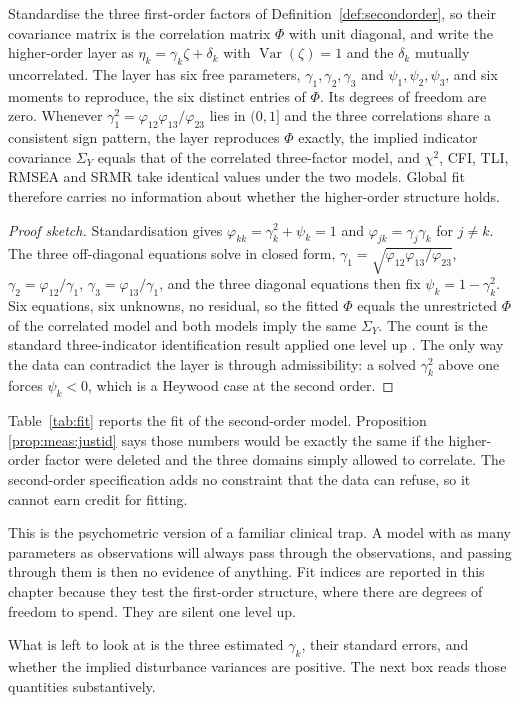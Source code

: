 \begin{proposition}
\label{prop:meas:justid}
Standardise the three first-order factors of Definition~\ref{def:secondorder},
so their covariance matrix is the correlation matrix $\Phi$ with unit diagonal,
and write the higher-order layer as $\eta_k=\gamma_k\zeta+\delta_k$ with
$\operatorname{Var}(\zeta)=1$ and the $\delta_k$ mutually uncorrelated. The
layer has six free parameters, $\gamma_1,\gamma_2,\gamma_3$ and
$\psi_1,\psi_2,\psi_3$, and six moments to reproduce, the six distinct entries
of $\Phi$. Its degrees of freedom are zero. Whenever
$\gamma_1^{2}=\varphi_{12}\varphi_{13}/\varphi_{23}$ lies in $(0,1]$ and the
three correlations share a consistent sign pattern, the layer reproduces $\Phi$
exactly, the implied indicator covariance $\Sigma_Y$ equals that of the
correlated three-factor model, and $\chi^{2}$, CFI, TLI, RMSEA and SRMR take
identical values under the two models. Global fit therefore carries no
information about whether the higher-order structure holds.
\end{proposition}

\begin{proof}[Proof sketch]
Standardisation gives $\varphi_{kk}=\gamma_k^{2}+\psi_k=1$ and
$\varphi_{jk}=\gamma_j\gamma_k$ for $j\neq k$. The three off-diagonal
equations solve in closed form,
$\gamma_1=\sqrt{\varphi_{12}\varphi_{13}/\varphi_{23}}$,
$\gamma_2=\varphi_{12}/\gamma_1$, $\gamma_3=\varphi_{13}/\gamma_1$, and the
three diagonal equations then fix $\psi_k=1-\gamma_k^{2}$. Six equations, six
unknowns, no residual, so the fitted $\Phi$ equals the unrestricted $\Phi$ of
the correlated model and both models imply the same $\Sigma_Y$. The count is
the standard three-indicator identification result applied one level up
\citep{bollen_1989}. The only way the data can contradict the layer is
through admissibility: a solved $\gamma_k^{2}$ above one forces $\psi_k<0$,
which is a Heywood case at the second order.
\end{proof}

\begin{reading}
Table~\ref{tab:fit} reports the fit of the second-order model. Proposition
\ref{prop:meas:justid} says those numbers would be exactly the same if the
higher-order factor were deleted and the three domains simply allowed to
correlate. The second-order specification adds no constraint that the data can
refuse, so it cannot earn credit for fitting.

This is the psychometric version of a familiar clinical trap. A model with as
many parameters as observations will always pass through the observations, and
passing through them is then no evidence of anything. Fit indices are reported
in this chapter because they test the first-order structure, where there are
degrees of freedom to spend. They are silent one level up.

What is left to look at is the three estimated $\gamma_k$, their standard
errors, and whether the implied disturbance variances are positive. The next
box reads those quantities substantively.
\end{reading}

